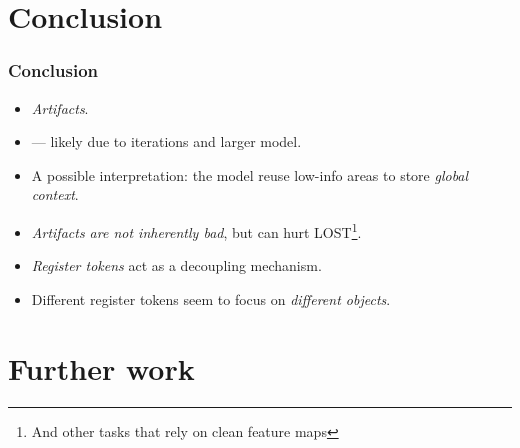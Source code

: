 \documentclass[aspectratio=169]{beamer}
\begin{document}


\section{Conclusion}

\begin{frame}
\frametitle{Conclusion}
\begin{itemize}
    \item \emph{Artifacts}.
    \item — likely due to iterations and larger model.
    \item A possible interpretation: the model reuse low-info areas to store \emph{global context}.
    \item \emph{Artifacts are not inherently bad}, but can hurt LOST\footnote{And other tasks that rely on clean feature maps}.
    \item \emph{Register tokens} act as a decoupling mechanism.
    \item Different register tokens seem to focus on \emph{different objects}.
\end{itemize}
\end{frame}


\section{Further work}
\end{document}
